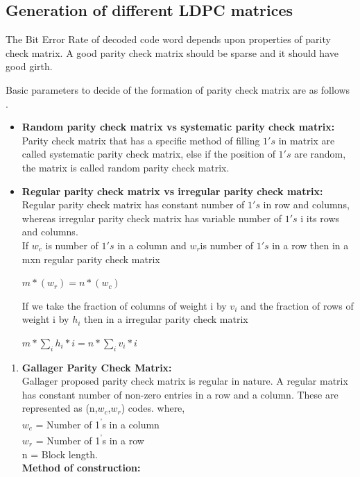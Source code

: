 \documentclass[twopage,12pt,a4paper]{report}
\begin{document}
\begin{raggedright}
\chapter{Generation of different LDPC matrices}

The Bit Error Rate of decoded code word depends upon properties of parity check matrix. A good parity check matrix should be sparse and  it should have good girth.  

Basic parameters to decide of the formation of parity check matrix are as follows . 
\begin{itemize}
\item  \textbf{Random parity check matrix vs systematic parity check matrix:} Parity check matrix that has a specific method of filling $1's$ in matrix are called systematic parity check matrix, else if the position of $1's$ are random, the matrix is called random parity check matrix.
\item\textbf{Regular parity check matrix vs irregular parity check matrix:} Regular parity check matrix has constant number of $1's$ in row and columns, whereas irregular parity check matrix has variable number of $1's$ i its rows and columns. \\
	If $w_c$ is number of $1's$ in a column and $w_r $is number of $1's$ in a row then in a mxn regular parity check matrix
\begin{center}
$ m * ( w_r ) = n * ( w_c ) $ 
\end{center}
If we take the fraction of columns
of weight i by $v_i$ and the fraction of rows of weight i by $h_i$ then in a irregular parity check matrix
\begin{center}
$ m * \sum_{i} h_i*i = n *\sum_{i} v_i*i $
\end{center}


\end{itemize} 
\begin{enumerate}
\item \textbf{Gallager Parity Check Matrix:} \\
Gallager proposed parity check matrix is regular in nature. A regular matrix has constant number of non-zero entries in a row and a column. 
These are represented as (n,$w_c$,$w_r$) codes. where,
\\
$w_c$ = Number of 1\textsuperscript{'}s in a column 
\\
$w_r$ = Number of 1\textsuperscript{'}s in a row 
\\
n = Block length. \\
\textbf{Method of construction:}


\end{enumerate}
\end{raggedright}
\end{document}
